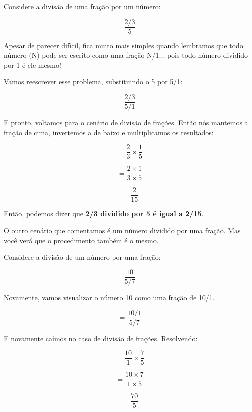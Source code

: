 \begin{exemplo}
    Considere a divisão de uma fração por um número:

    \begin{equation}
        \frac{2/3}{5}
    \end{equation}

    Apesar de parecer difícil, fica muito mais simples quando lembramos que todo número (N) pode ser escrito como uma fração N/1... pois todo número dividido por 1 é ele mesmo!

    Vamos reescrever esse problema, substituindo o 5 por 5/1:

    \begin{equation}
        \frac{2/3}{5/1}
    \end{equation}

    E pronto, voltamos para o cenário de divisão de frações. Então nós mantemos a fração de cima, invertemos a de baixo e multiplicamos os resultados:

    \begin{equation}
        =\frac{2}{3}\times\frac{1}{5}
    \end{equation}

    \begin{equation}
        =\frac{2\times1}{3\times5}
    \end{equation}

    \begin{equation}
        =\frac{2}{15}
    \end{equation}

    Então, podemos dizer que \textbf{2/3 dividido por 5 é igual a 2/15}.
    
\end{exemplo}

O outro cenário que comentamos é um número dividido por uma fração. Mas você verá que o procedimento também é o mesmo.

\begin{exemplo}
    Considere a divisão de um número por uma fração:

    \begin{equation}
        \frac{10}{5/7}
    \end{equation}

    Novamente, vamos visualizar o número 10 como uma fração de 10/1. 

    \begin{equation}
        =\frac{10/1}{5/7}
    \end{equation}

    E novamente caímos no caso de divisão de frações. Resolvendo:

    \begin{equation}
        =\frac{10}{1}\times\frac{7}{5}
    \end{equation}

    \begin{equation}
        =\frac{10\times7}{1\times5}
    \end{equation}

    \begin{equation}
        =\frac{70}{5}
    \end{equation}
\end{exemplo}

